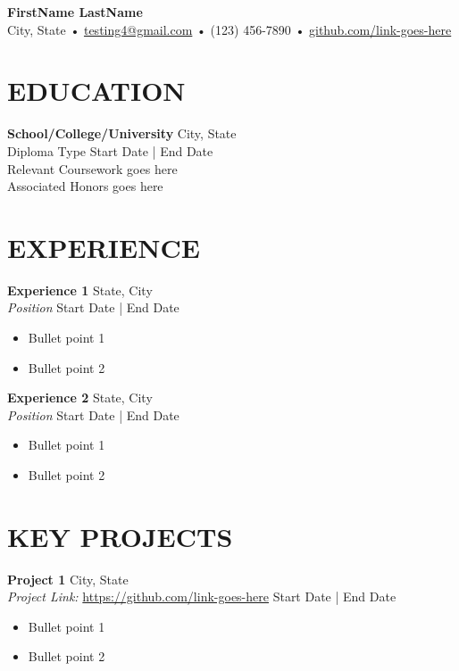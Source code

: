 \documentclass[a4paper,9pt]{extarticle}
\begin{document}

\pagestyle{empty}

\begin{center}
\textbf{\Large FirstName LastName}\\[2pt] %
City, State • \href{mailto:testing@gmail.com}{testing4@gmail.com} • (123) 456-7890 • \href{https://www.github.com/link-goes-here}{github.com/link-goes-here} %
\end{center}

\section*{EDUCATION}
\noindent
\textbf{School/College/University} \hfill City, State \\
Diploma Type \hfill Start Date | End Date \\
Relevant Coursework goes here \\
Associated Honors goes here \\

\section*{EXPERIENCE}
\noindent
\textbf{Experience 1} \hfill State, City \\
\textit{Position} \hfill Start Date | End Date
\begin{itemize}
    \item Bullet point 1
    \item Bullet point 2
\end{itemize}

\noindent
\newline
\textbf{Experience 2} \hfill State, City \\
\textit{Position} \hfill Start Date | End Date
\begin{itemize}
    \item Bullet point 1
    \item Bullet point 2
\end{itemize}


\section*{KEY PROJECTS}
\noindent
\textbf{Project 1} \hfill City, State \\
\textit{Project Link:} \url{https://github.com/link-goes-here} \hfill Start Date | End Date
\begin{itemize}
    \item Bullet point 1
    \item Bullet point 2
\end{itemize}
\end{document}
